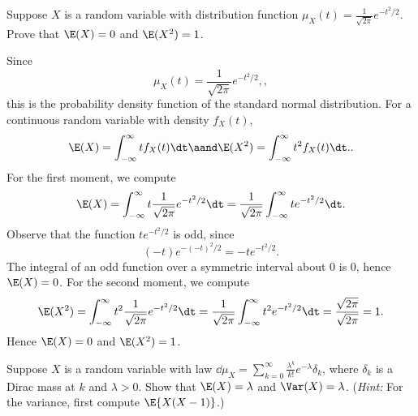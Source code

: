 \renewcommand\P{\mathbb{P}}

\begin{problem}[1]
  Suppose $X$ is a random variable with distribution function $\mu_X(t) = \frac{1}{\sqrt{2\pi}} e^{-t^2/2}$. Prove that $\E(X) = 0$ and $\E(X^2) = 1$.
\end{problem}

\begin{solution}
  Since
  \[%
    \mu_X(t) = \frac{1}{\sqrt{2\pi}} e^{-t^2/2},
  ,\]%
  this is the probability density function of the standard normal distribution. For a continuous random variable with density $f_X(t)$,
  \[%
    \E(X) = \int_{-\infty}^{\infty} t f_X(t) \dt \aand \E(X^2) = \int_{-\infty}^{\infty} t^2 f_X(t) \dt.
  .\]%
  For the first moment, we compute
  \[%
    \E(X) = \int_{-\infty}^{\infty} t \frac{1}{\sqrt{2\pi}} e^{-t^2/2} \dt = \frac{1}{\sqrt{2\pi}}\int_{-\infty}^{\infty} t e^{-t^2/2} \dt
  .\]%
  Observe that the function $te^{-t^2/2}$ is odd, since
  \[%
    (-t)e^{-(-t)^2/2} = -te^{-t^2/2}
  .\]%
  The integral of an odd function over a symmetric interval about $0$ is $0$, hence $\E(X) = 0$. For the second moment, we compute
  \[%
    \E(X^2) = \int_{-\infty}^{\infty} t^2 \frac{1}{\sqrt{2\pi}} e^{-t^2/2} \dt = \frac{1}{\sqrt{2\pi}}\int_{-\infty}^{\infty} t^2 e^{-t^2/2} \dt = \frac{\sqrt{2\pi}}{\sqrt{2\pi}} = 1
  .\]%
  Hence $\E(X) = 0$ and $\E(X^2) = 1$.
\end{solution}

\begin{problem}[2]
  Suppose $X$ is a random variable with law $\dd{\mu}_X = \sum_{k=0}^\infty \frac{\lambda^k}{k!} e^{-\lambda}\delta_k$, where $\delta_k$ is a Dirac mass at $k$ and $\lambda>0$.  Show that $\E(X) = \lambda$ and $\Var(X) = \lambda$. (\emph{Hint:} For the variance, first compute $\E\{X(X-1)\}$.) 
\end{problem}

